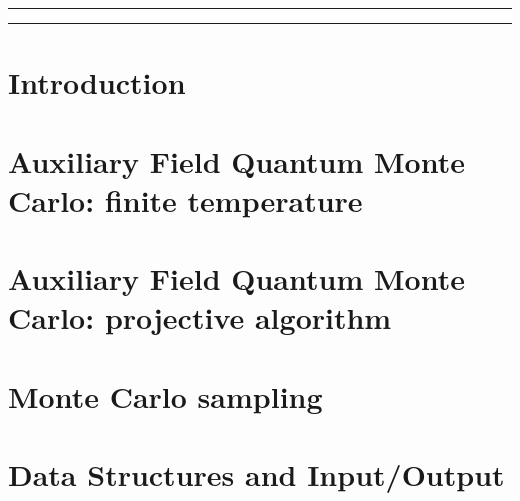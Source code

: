 \documentclass[submission, PhysCodeb]{SciPost}
\begin{document}


\vspace{10pt}
\noindent\rule{\textwidth}{1pt}
\tableofcontents\thispagestyle{fancy}
\noindent\rule{\textwidth}{1pt}
\vspace{10pt}

\section{Introduction}\label{sec:intro}

\section{Auxiliary Field Quantum Monte Carlo: finite temperature}\label{sec:def}




\section{Auxiliary Field Quantum Monte Carlo: projective algorithm}\label{sec:defT0}

\section{Monte Carlo sampling}\label{sec:sampling}

\section{Data Structures and Input/Output}\label{sec:imp}


\end{document}
